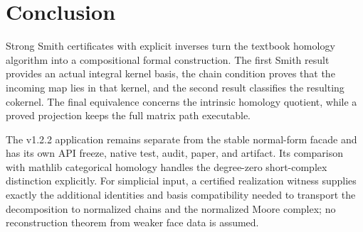 \section{Conclusion}

Strong Smith certificates with explicit inverses turn the textbook homology
algorithm into a compositional formal construction.  The first Smith result
provides an actual integral kernel basis, the chain condition proves that
the incoming map lies in that kernel, and the second result classifies the
resulting cokernel.  The final equivalence concerns the intrinsic homology
quotient, while a proved projection keeps the full matrix path executable.

The v1.2.2 application remains separate from the stable normal-form facade
and has its own API freeze, native test, audit, paper, and artifact.  Its
comparison with mathlib categorical homology handles the degree-zero
short-complex distinction explicitly.  For simplicial input, a certified
realization witness supplies exactly the additional identities and basis
compatibility needed to transport the decomposition to normalized chains and
the normalized Moore complex; no reconstruction theorem from weaker face
data is assumed.
